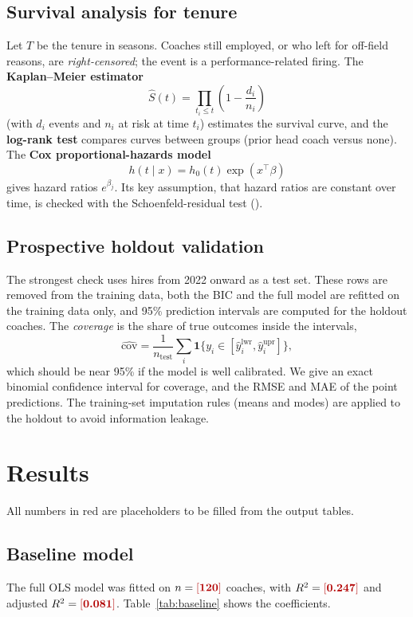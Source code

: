 \documentclass[11pt,a4paper]{article}
\newcommand{\var}[1]{\texttt{\detokenize{#1}}}
\newcommand{\ph}[1]{\textcolor{red!70!black}{[\textbf{#1}]}}
\begin{document}
\subsection{Survival analysis for tenure}
Let $T$ be the tenure in seasons. Coaches still employed, or who left for off-field reasons, are \emph{right-censored}; the event is a performance-related firing. The \textbf{Kaplan--Meier estimator}
\[
\hat S(t)=\prod_{t_i\le t}\left(1-\frac{d_i}{n_i}\right)
\]
(with $d_i$ events and $n_i$ at risk at time $t_i$) estimates the survival curve, and the \textbf{log-rank test} compares curves between groups (prior head coach versus none). The \textbf{Cox proportional-hazards model}
\[
h(t\mid x)=h_0(t)\exp(x^\top\beta)
\]
gives hazard ratios $e^{\beta_j}$. Its key assumption, that hazard ratios are constant over time, is checked with the Schoenfeld-residual test (\var{cox.zph}).

\subsection{Prospective holdout validation}
The strongest check uses hires from 2022 onward as a test set. These rows are removed from the training data, both the BIC and the full model are refitted on the training data only, and 95\% prediction intervals are computed for the holdout coaches. The \emph{coverage} is the share of true outcomes inside the intervals,
\[
\widehat{\mathrm{cov}}=\frac{1}{n_{\text{test}}}\sum_{i}\mathbf 1\{y_i\in[\hat y_i^{\text{lwr}},\hat y_i^{\text{upr}}]\},
\]
which should be near 95\% if the model is well calibrated. We give an exact binomial confidence interval for coverage, and the RMSE and MAE of the point predictions. The training-set imputation rules (means and modes) are applied to the holdout to avoid information leakage.

\section{Results}\label{sec:results}
All numbers in red are placeholders to be filled from the output tables.

\subsection{Baseline model}
The full OLS model was fitted on $n=\ph{120}$ coaches, with $R^2=\ph{0.247}$ and adjusted $R^2=\ph{0.081}$. Table~\ref{tab:baseline} shows the coefficients.
\end{document}
